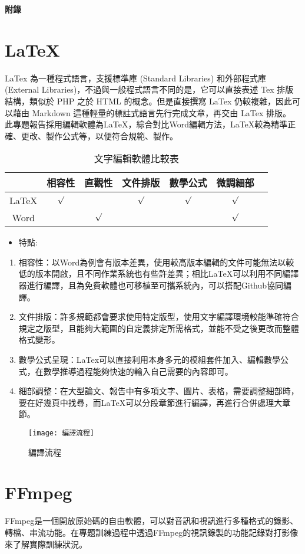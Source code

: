 \begin{appendix}
\renewcommand{\thesection}{\bf 附錄 \Alph{section}}%
\begin{center}
\fontsize{20pt}{0em}\selectfont\bf 附錄
\end{center}
\section*{LaTeX}
LaTex 為一種程式語言，支援標準庫 (Standard Libraries) 和外部程式庫 (External Libraries)，不過與一般程式語言不同的是，它可以直接表述 Tex 排版結構，類似於 PHP 之於 HTML 的概念。但是直接撰寫 LaTex 仍較複雜，因此可以藉由 Markdown 這種輕量的標註式語言先行完成文章，再交由 LaTex 排版。
此專題報告採用編輯軟體為LaTeX，綜合對比Word編輯方法，LaTeX較為精準正確、更改、製作公式等，以便符合規範、製作。
 \begin{table}[htbp] %
			\centering%
			\caption{文字編輯軟體比較表}%
			\large%
			\label{tab_文字編輯軟體比較表:scale}
			\begin{tabular}{|c|c|c|c|c|c|c|}
			\hline
			\diagbox[width=5em]& 相容性 & 直觀性 & 文件排版 & 數學公式 & 微調細部\\ 
			\hline
			LaTeX 		&$\surd$&		&$\surd$&$\surd$&$\surd$\\
			\hline
			Word	 	&		&$\surd$&		&		&$\surd$\\
			\hline
			
			\end{tabular}
		\end{table}	

\begin{itemize} 
\item 特點:
\end{itemize}
\begin{enumerate}
\item 相容性：以Word為例會有版本差異，使用較高版本編輯的文件可能無法以較低的版本開啟，且不同作業系統也有些許差異；相比LaTeX可以利用不同編譯器進行編譯，且為免費軟體也可移植至可攜系統內，可以搭配Github協同編譯。
\item 文件排版：許多規範都會要求使用特定版型，使用文字編譯環境較能準確符合規定之版型，且能夠大範圍的自定義排定所需格式，並能不受之後更改而整體格式變形。
\item 數學公式呈現：LaTex可以直接利用本身多元的模組套件加入、編輯數學公式，在數學推導過程能夠快速的輸入自己需要的內容即可。
\item 細部調整：在大型論文、報告中有多項文字、圖片、表格，需要調整細部時，要在好幾頁中找尋，而LaTeX可以分段章節進行編譯，再進行合併處理大章節。
\end{enumerate}
\begin{figure}[hbt!]
\begin{center}
\texttt{[image: 編譯流程]}
\caption{\Large 編譯流程}
\label{fig.編譯流程}
\end{center}
\end{figure}
\end{appendix}
\section*{FFmpeg}
FFmpeg是一個開放原始碼的自由軟體，可以對音訊和視訊進行多種格式的錄影、轉檔、串流功能。在專題訓練過程中透過FFmpeg的視訊錄製的功能記錄對打影像來了解實際訓練狀況。
\newpage